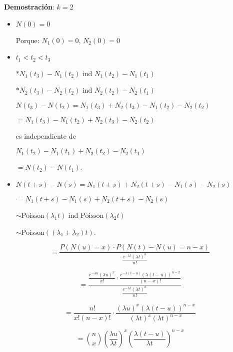 \documentclass[12pt,a4paper]{article}
\begin{document}
\textbf{Demostración}: $k = 2$

\begin{itemize}
    \item $N(0) = 0$
    
    Porque: $N_1(0) = 0$, $N_2(0) = 0$
    
    \item $t_1 < t_2 < t_3$
    
    $* N_1(t_3) - N_1(t_2)$ ind $N_1(t_2) - N_1(t_1)$
    
    $* N_2(t_3) - N_2(t_2)$ ind $N_2(t_2) - N_2(t_1)$
    
    $N(t_3) - N(t_2) = N_1(t_3) + N_2(t_3) - N_1(t_2) - N_2(t_2)$
    
    $= N_1(t_3) - N_1(t_2) + N_2(t_3) - N_2(t_2)$
    
    es independiente de
    
    $N_1(t_2) - N_1(t_1) + N_2(t_2) - N_2(t_1)$
    
    $= N(t_2) - N(t_1)$.
    
    \item $N(t+s) - N(s) = N_1(t+s) + N_2(t+s) - N_1(s) - N_2(s)$
    
    $= N_1(t+s) - N_1(s) + N_2(t+s) - N_2(s)$
    
    $\sim \text{Poisson}(\lambda_1 t)$ ind $\text{Poisson}(\lambda_2 t)$
    
    $\sim \text{Poisson}((\lambda_1 + \lambda_2)t)$.
\end{itemize}

\begin{equation*}
= \frac{P(N(u) = x) \cdot P(N(t) - N(u) = n - x)}{\frac{e^{-\lambda t} (\lambda t)^n}{n!}}
\end{equation*}

\begin{equation*}
= \frac{\frac{e^{-\lambda u} (\lambda u)^x}{x!} \cdot \frac{e^{-\lambda(t-u)} (\lambda(t-u))^{n-x}}{(n-x)!}}{\frac{e^{-\lambda t} (\lambda t)^n}{n!}}
\end{equation*}

\begin{equation*}
= \frac{n!}{x!(n-x)!} \cdot \frac{(\lambda u)^x (\lambda(t-u))^{n-x}}{(\lambda t)^x (\lambda t)^{n-x}}
\end{equation*}

\begin{equation*}
= \binom{n}{x} \left(\frac{\lambda u}{\lambda t}\right)^x \left(\frac{\lambda(t-u)}{\lambda t}\right)^{n-x}
\end{equation*}
\end{document}
